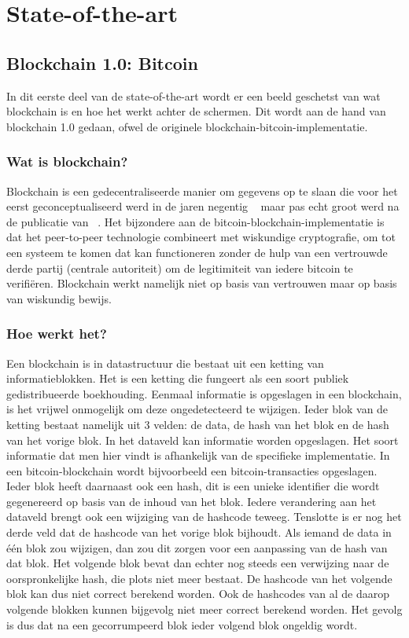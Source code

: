 \section{State-of-the-art}
\label{sec:state-of-the-art}

\subsection*{Blockchain 1.0: Bitcoin}
In dit eerste deel van de state-of-the-art wordt er een beeld geschetst van wat blockchain is en hoe het werkt achter de schermen. Dit wordt aan de hand van blockchain 1.0 gedaan, ofwel de originele blockchain-bitcoin-implementatie.
\subsubsection*{Wat is blockchain?}
 Blockchain is een gedecentraliseerde manier om gegevens op te slaan die voor het eerst geconceptualiseerd werd in de jaren negentig  ~\autocite{Dai1998} maar pas echt groot werd na de publicatie van ~\textcite{Nakamoto2008}. Het bijzondere aan de bitcoin-blockchain-implementatie is dat het peer-to-peer technologie combineert met wiskundige cryptografie, om tot een systeem te komen dat kan functioneren zonder de hulp van een vertrouwde derde partij  (centrale autoriteit) om de legitimiteit van iedere bitcoin te verifiëren. Blockchain werkt namelijk niet op basis van vertrouwen maar op basis van wiskundig bewijs.
 
 \subsubsection*{Hoe werkt het?}
Een blockchain is in datastructuur die bestaat uit een ketting van informatieblokken. Het is een ketting die fungeert als een soort publiek gedistribueerde boekhouding. Eenmaal informatie is opgeslagen in een blockchain, is het vrijwel onmogelijk om deze ongedetecteerd te wijzigen. Ieder blok van de ketting bestaat namelijk uit 3 velden: de data, de hash van het blok en de hash van het vorige blok. In het dataveld kan informatie worden opgeslagen. Het soort informatie dat men hier vindt is afhankelijk van de specifieke implementatie. In een bitcoin-blockchain wordt bijvoorbeeld een bitcoin-transacties opgeslagen. Ieder blok heeft daarnaast ook een hash, dit is een unieke identifier die wordt gegenereerd op basis van de inhoud van het blok. Iedere verandering aan het dataveld brengt ook een wijziging van de hashcode teweeg. Tenslotte is er nog het derde veld dat de hashcode van het vorige blok bijhoudt. Als iemand de data in één blok zou wijzigen, dan zou dit zorgen voor een aanpassing van de hash van dat blok. Het volgende blok bevat dan echter nog steeds een verwijzing naar de oorspronkelijke hash, die plots niet meer bestaat. De hashcode van het volgende blok kan dus niet  correct berekend worden. Ook de hashcodes van al de daarop volgende blokken kunnen bijgevolg niet meer correct berekend worden. Het gevolg is dus dat na een gecorrumpeerd blok ieder volgend blok ongeldig wordt. 

